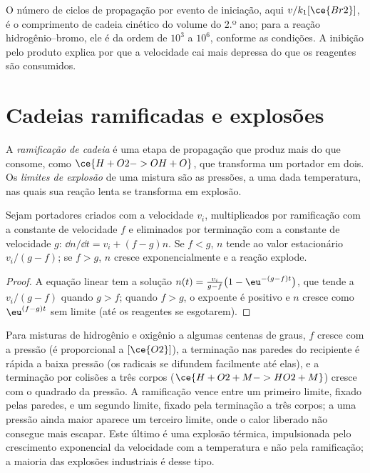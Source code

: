 O número de ciclos de propagação por evento de iniciação, aqui $v/k_1[\ce{Br2}]$, é o
comprimento de cadeia cinético do volume do 2.º ano; para a reação hidrogênio--bromo,
ele é da ordem de $10^3$ a $10^6$, conforme as condições. A inibição pelo produto
explica por que a velocidade cai mais depressa do que os reagentes são consumidos.

\section{Cadeias ramificadas e explosões}

\begin{definition}\label{def:b3:complex-kinetics:branching}
A \emph{ramificação de cadeia} é uma etapa de propagação
que produz mais  do que consome, como $\ce{H + O2 -> OH + O}$, que
transforma um portador em dois. Os \emph{limites de explosão} de uma
mistura são as pressões, a uma dada temperatura, nas quais sua reação lenta se
transforma em explosão.
\end{definition}

\begin{proposition}\label{prop:b3:complex-kinetics:branching}
Sejam portadores criados com a velocidade $v_i$, multiplicados por ramificação com a
constante de velocidade $f$ e eliminados por terminação com a constante de velocidade $g$:
$\dd n/\dd t = v_i + (f - g)n$. Se $f < g$, $n$ tende ao valor estacionário $v_i/(g - f)$; se
$f > g$, $n$ cresce exponencialmente e a reação explode.
\end{proposition}

\begin{proof}
A equação linear tem a solução $n(t) = \frac{v_i}{g - f}\bigl(1 - \eu^{-(g - f)t}\bigr)$, que
tende a $v_i/(g - f)$ quando $g > f$; quando $f > g$, o expoente é positivo e $n$
cresce como $\eu^{(f - g)t}$ sem limite (até os reagentes se esgotarem).
\end{proof}

Para misturas de hidrogênio e oxigênio a algumas centenas de graus, $f$ cresce com
a pressão (é proporcional a $[\ce{O2}]$), a terminação nas paredes do recipiente é
rápida a baixa pressão (os radicais se difundem facilmente até elas), e a
terminação por colisões a três corpos ($\ce{H + O2 + M -> HO2 + M}$) cresce com o
quadrado da pressão. A ramificação vence entre um primeiro limite, fixado pelas
paredes, e um segundo limite, fixado pela terminação a três corpos; a uma pressão
ainda maior aparece um terceiro limite, onde o calor liberado não consegue mais
escapar. Este último é uma explosão térmica, impulsionada pelo crescimento
exponencial da velocidade com a temperatura e não pela ramificação; a maioria das
explosões industriais é desse tipo.

